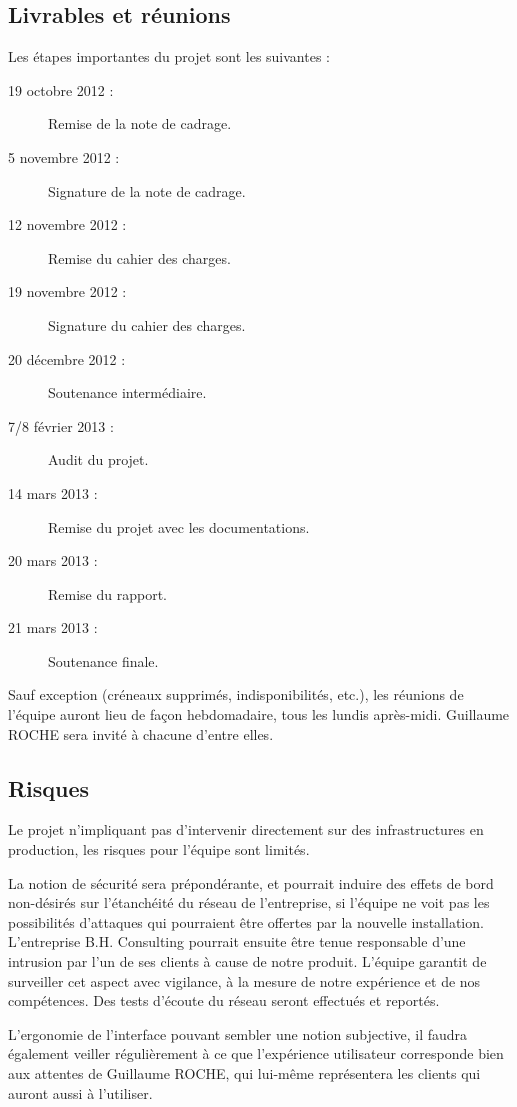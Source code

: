 \subsection{Livrables et réunions}

Les étapes importantes du projet sont les suivantes :

\begin{description}
\item[19 octobre 2012 :] Remise de la note de cadrage.
\item[5 novembre 2012 :] Signature de la note de cadrage.
\item[12 novembre 2012 :] Remise du cahier des charges.
\item[19 novembre 2012 :] Signature du cahier des charges.
\item[20 décembre 2012 :] Soutenance intermédiaire.
\item[7/8 février 2013 :] Audit du projet.
\item[14 mars 2013 :] Remise du projet avec les documentations.
\item[20 mars 2013 :] Remise du rapport.
\item[21 mars 2013 :] Soutenance finale.
\end{description}

Sauf exception (créneaux supprimés, indisponibilités, etc.), les réunions de l'équipe auront lieu de façon hebdomadaire, tous les lundis après-midi. Guillaume ROCHE sera invité à chacune d'entre elles.

\subsection{Risques}

Le projet n'impliquant pas d'intervenir directement sur des infrastructures en production, les risques pour l'équipe sont limités.

La notion de sécurité sera prépondérante, et pourrait induire des effets de bord non-désirés sur l'étanchéité du réseau de l'entreprise, si l'équipe ne voit pas les possibilités d'attaques qui pourraient être offertes par la nouvelle installation. L'entreprise B.H. Consulting pourrait ensuite être tenue responsable d'une intrusion par l'un de ses clients à cause de notre produit. L'équipe garantit de surveiller cet aspect avec vigilance, à la mesure de notre expérience et de nos compétences. Des tests d'écoute du réseau seront effectués et reportés.

L'ergonomie de l'interface pouvant sembler une notion subjective, il faudra également veiller régulièrement à ce que l'expérience utilisateur corresponde bien aux attentes de Guillaume ROCHE, qui lui-même représentera les clients qui auront aussi à l'utiliser.

